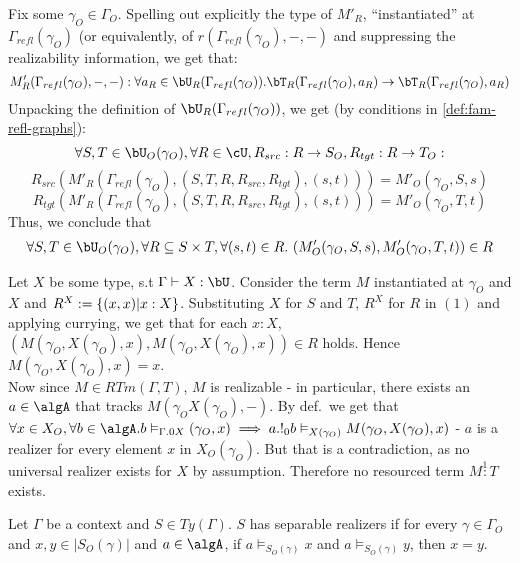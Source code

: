 \documentclass[12pt,a4paper]{article}
\def\src{_{src}}
\def\rfl{_{refl}}
\def\tgt{_{tgt}}
\renewcommand{\O}{_{O}}\alwaysmath{O}
\newcommand{\R}{\ensuremath{_{R}}}
\begin{document}
Fix some $\gamma\O \in \Gamma\O$. Spelling out explicitly the type of $M'\R$, ``instantiated'' at $\Gamma\rfl(\gamma\O)$ (or equivalently, of $r(\Gamma\rfl(\gamma\O), - , -)$ and suppressing the realizability information, we get that:
$$M'\R(\Gamma\rfl(\gamma\O), -, -) : \forall a\R \in \bU\R(\Gamma\rfl(\gamma\O)). \bT\R(\Gamma\rfl(\gamma\O), a\R) \to \bT\R(\Gamma\rfl(\gamma\O), a\R)$$
Unpacking the definition of $\bU\R(\Gamma\rfl(\gamma\O))$, we get (by conditions in \cref{def:fam-refl-graphs}):
$$\forall S, T \in \bU\O(\gamma\O), \forall R \in \cU , R\src : R \to S\O, R\tgt : R \to T\O:$$
$$R\src(M'\R(\Gamma\rfl(\gamma\O),(S,T,R, R\src, R\tgt), (s,t))) = M'\O(\gamma\O, S, s)$$
$$R\tgt(M'\R(\Gamma\rfl(\gamma\O),(S,T,R, R\src, R\tgt),  (s,t))) = M'\O(\gamma\O, T, t)$$
Thus, we conclude that 
\begin{align}
\forall S, T \in \bU\O(\gamma\O), \forall R \subseteq S \times T,  \forall (s,t) \in R.\ (M'\O(\gamma\O, S, s), M'\O(\gamma\O, T, t)) \in R
\end{align}

Let $X$ be some type, s.t $\Gamma \vdash X : \bU$. Consider the term $M$ instantiated at $\gamma\O$ and $X$ and $R^X := \{(x,x) | x : X\}$. Substituting $X$ for $S$ and $T$, $R^X$ for $R$ in $(1)$ and applying currying, we get that for each $x : X$, $(M(\gamma\O, X(\gamma\O), x), M(\gamma\O, X(\gamma\O), x)) \in R$ holds. Hence $M(\gamma\O, X(\gamma\O), x) = x$.\\

Now since $M \in RTm(\Gamma, T)$, $M$ is realizable - in particular, there exists an $a \in \algA$ that tracks $M(\gamma\O X(\gamma\O), -)$. By def.\ we get that $\forall x \in X\O, \forall b \in \algA. b \vDash_{\Gamma.0 X} (\gamma\O, x) \implies a . !_0 b \vDash_{X(\gamma\O)} M(\gamma\O, X(\gamma\O), x)$ - $a$ is a realizer for every element $x$ in $X\O(\gamma\O)$. But that is a contradiction, as no universal realizer exists for $X$ by assumption. Therefore no resourced term $M \overset{1}{:} T$ exists.\begin{definition}
  Let $\Gamma$ be a context and $S \in Ty(\Gamma)$. $S$ has separable realizers if for every $\gamma \in \Gamma\O$ and $x, y  \in |S\O(\gamma)|$ and $a \in \algA$, if $a \vDash_{S\O(\gamma)} x$ and $a \vDash_{S\O(\gamma)} y$, then $x = y$.
\end{definition}
\end{document}
